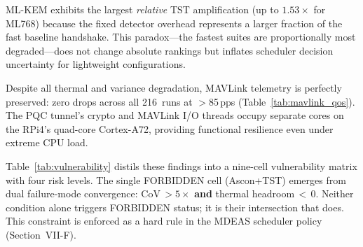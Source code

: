 ML-KEM exhibits the largest \emph{relative} TST amplification
(up to $1.53\times$ for ML768) because the fixed detector overhead
represents a larger fraction of the fast baseline handshake.  This
paradox---the fastest suites are proportionally most degraded---does
not change absolute rankings but inflates scheduler decision
uncertainty for lightweight configurations.

Despite all thermal and variance degradation, MAVLink telemetry is
perfectly preserved: zero drops across all 216~runs at $>$85\,pps
(Table~\ref{tab:mavlink_qos}).  The PQC tunnel's crypto and MAVLink
I/O threads occupy separate cores on the RPi4's quad-core Cortex-A72,
providing functional resilience even under extreme CPU load.

Table~\ref{tab:vulnerability} distils these findings into a
nine-cell vulnerability matrix with four risk levels.  The single
FORBIDDEN cell (Ascon+TST) emerges from dual failure-mode
convergence: CoV\,$>5\times$ \textbf{and} thermal headroom\,$<$\,0.
Neither condition alone triggers FORBIDDEN status; it is their
intersection that does.  This constraint is enforced as a hard
rule in the MDEAS scheduler policy (Section~VII-F).
